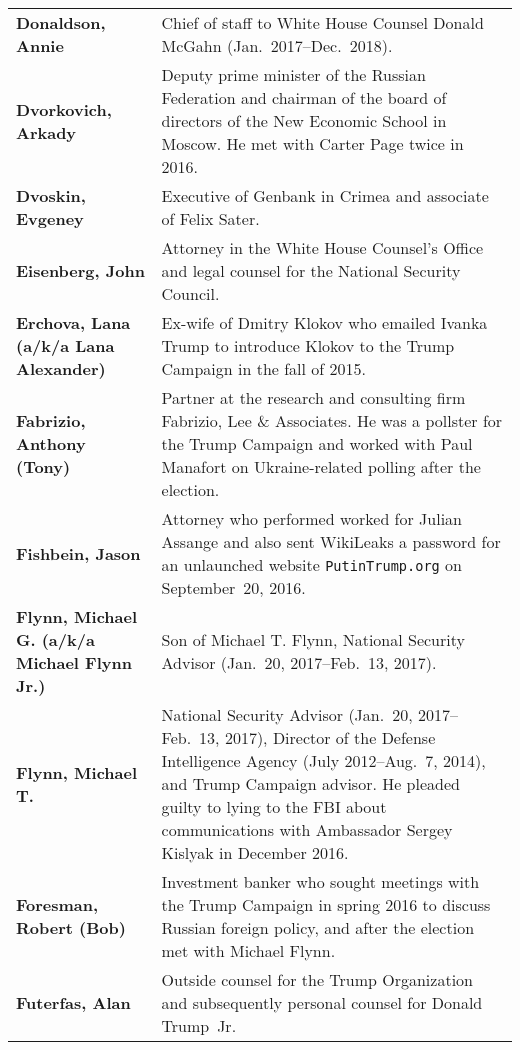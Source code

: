 \begin{longtable}{ p{} p{} }
    \textbf{Donaldson, Annie} & Chief of staff to White House Counsel Donald McGahn (Jan.~2017--Dec.~2018). \\

    \textbf{Dvorkovich, Arkady} & Deputy prime minister of the Russian Federation and chairman of the board of directors of the New Economic School in Moscow. He met with Carter Page twice in 2016. \\

    \textbf{Dvoskin, Evgeney} & Executive of Genbank in Crimea and associate of Felix Sater. \\

    \textbf{Eisenberg, John} & Attorney in the White House Counsel's Office and legal counsel for the National Security Council. \\

    \textbf{Erchova, Lana (a/k/a Lana Alexander)} & Ex-wife of Dmitry Klokov who emailed Ivanka Trump to introduce Klokov to the Trump Campaign in the fall of 2015. \\

    \textbf{Fabrizio, Anthony (Tony)} & Partner at the research and consulting firm Fabrizio, Lee \& Associates. He was a pollster for the Trump Campaign and worked with Paul Manafort on Ukraine-related polling after the election. \\

    \textbf{Fishbein, Jason} & Attorney who performed worked for Julian Assange and also sent WikiLeaks a password for an unlaunched website \verb+PutinTrump.org+ on September~20, 2016. \\

    \textbf{Flynn, Michael G. (a/k/a Michael Flynn Jr.)} & Son of Michael T. Flynn, National Security Advisor (Jan.~20, 2017--Feb.~13, 2017). \\

    \textbf{Flynn, Michael T.} & National Security Advisor (Jan.~20, 2017--Feb.~13, 2017), Director of the Defense Intelligence Agency (July 2012--Aug.~7, 2014), and Trump Campaign advisor. He pleaded guilty to lying to the FBI about communications with Ambassador Sergey Kislyak in December 2016. \\

    \textbf{Foresman, Robert (Bob)} & Investment banker who sought meetings with the Trump Campaign in spring 2016 to discuss Russian foreign policy, and after the election met with Michael Flynn. \\

    \textbf{Futerfas, Alan} & Outside counsel for the Trump Organization and subsequently personal counsel for Donald Trump~Jr. \\


\end{longtable}
